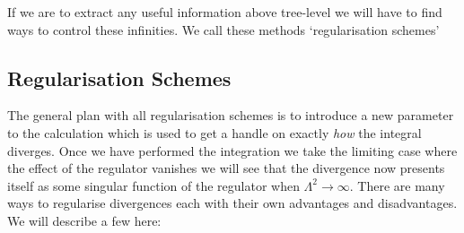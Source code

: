 	If we are to extract any useful information above tree-level we will have to find ways to control these infinities.  We call these methods `regularisation schemes'

	\subsection{Regularisation Schemes}

	The general plan with all regularisation schemes is to introduce a new parameter to the calculation which is used to get a handle on exactly \emph{how} the integral diverges.  Once we have performed the integration we take the limiting case where the effect of the regulator vanishes we will see that the divergence now presents itself as some singular function of the regulator when $\Lambda^2\rightarrow\infty$.  There are many ways to regularise divergences each with their own advantages and disadvantages.  We will describe a few here:

